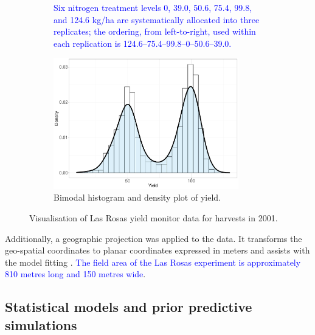 \documentclass[a4paper]{article}   	%
\begin{document}
\begin{figure}[!htp]
\begin{subfigure}[t]{0.45\textwidth}
			\caption{\textcolor{blue}{Six nitrogen treatment levels 0, 39.0, 50.6, 75.4, 99.8, and 124.6 kg/ha are systematically allocated into three replicates; the ordering, from left-to-right, used within each replication is 124.6--75.4--99.8--0--50.6--39.0.}}\label{fig:lasrossatopo}
		\end{subfigure}
		\space
		\begin{subfigure}[t]{0.45\textwidth}
			\centering
			\includegraphics[height=5.7cm,width=\linewidth]{Images/lasrossa_view04}
			\caption{Bimodal histogram and density plot of yield.}\label{fig:lasrossahist}
		\end{subfigure}
		\caption{Visualisation of Las Rosas yield monitor data for harvests in 2001.}\label{fig:lasrossa}
	\end{figure}
	
	
	Additionally, a geographic projection was applied to the data. It transforms the geo-spatial coordinates to planar coordinates expressed in meters and assists with the model fitting \parencite{Rakshit2020Novel}. \textcolor{blue}{The field area of the Las Rosas experiment is approximately 810 metres long and 150 metres wide}.
	
	
	
	\subsection{Statistical models and prior predictive simulations}
	
\end{document}
